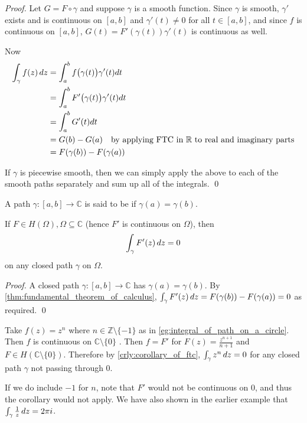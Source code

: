 \documentclass[11pt, oneside]{book}
\begin{document}
\begin{proof}
	Let $G = F \circ \gamma$ and suppose $\gamma$ is a smooth function. Since $\gamma$ is smooth, $\gamma'$ exists and is continuous on $[a, b]$ and $\gamma'(t) \neq 0$ for all $t \in [a, b]$, and since $f$ is continuous on $[a, b]$, $G(t) = F'(\gamma(t))\gamma'(t)$ is continuous as well.

	Now
	\begin{align*}
		\int_{\gamma} f(z) \mathop{}\!d{z}
			&= \int_{a}^{b} f\big(\gamma(t)\big)\gamma'(t) dt \\
			&= \int_{a}^{b} F'\big(\gamma(t)\big)\gamma'(t) dt \\
			&= \int_{a}^{b} G'(t) dt \\
			&= G(b) - G(a) \quad \text{by applying FTC in } \mathbb{R} \text{ to real and imaginary parts} \\
			&= F(\gamma(b)) - F(\gamma(a))
	\end{align*}

	If $\gamma$ is piecewise smooth, then we can simply apply the above to each of the smooth paths separately and sum up all of the integrals. \qed
\end{proof}

\begin{defn}\label{defn:closed_path}
	A path $\gamma: [a, b] \to \mathbb{C}$ is said to be  if $\gamma(a) = \gamma(b)$.
\end{defn}

\begin{crly}\label{crly:corollary_of_ftc}
	If $F \in H(\Omega), \Omega \subseteq \mathbb{C}$ (hence $F'$ is continuous on $\Omega$), then
	\begin{equation*}
		\int_{\gamma} F'(z) \mathop{}\!d{z} = 0
	\end{equation*}
	on any closed path $\gamma$ on $\Omega$.
\end{crly}

\begin{proof}
	A closed path $\gamma: [a, b] \to \mathbb{C}$ has $\gamma(a) = \gamma(b)$. By \cref{thm:fundamental_theorem_of_calculus}, $\int_{\gamma} F'(z) \mathop{}\!d{z} = F(\gamma(b)) - F(\gamma(a)) = 0$ as required. \qed
\end{proof}

\begin{eg}
	Take $f(z) = z^n$ where $n \in \mathbb{Z} \setminus \{-1\}$ as in \cref{eg:integral_of_path_on_a_circle}. Then $f$ is continuous on $\mathbb{C} \setminus \{0\}$ . Then $f = F'$ for $F(z) = \frac{z^{n + 1}}{n + 1}$ and $F \in H(\mathbb{C} \setminus \{0\})$. Therefore by \cref{crly:corollary_of_ftc}, $\int_{\gamma} z^n \mathop{}\!d{z} = 0$ for any closed path $\gamma$ not passing through $0$.

	If we do include $-1$ for $n$, note that $F'$ would not be continuous on $0$, and thus the corollary would not apply. We have also shown in the earlier example that $\int_{\gamma} \frac{1}{z} \mathop{}\!d{z} = 2 \pi i$.
\end{eg}
\end{document}
